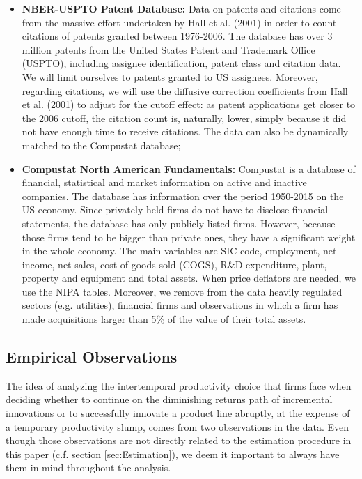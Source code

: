 \documentclass[letterpaper,12pt]{article}
\theoremstyle{definition}
\begin{document}
\begin{itemize}
	\item \textbf{NBER-USPTO Patent Database:} Data on patents and citations come from the massive effort undertaken by Hall et al. (2001) in order to count citations of patents granted between 1976-2006. The database has over 3 million patents from the United States Patent and Trademark Office (USPTO), including assignee identification, patent class and citation data. We will limit ourselves to patents granted to US assignees. Moreover, regarding citations, we will use the diffusive correction coefficients from Hall et al. (2001) to adjust for the cutoff effect: as patent applications get closer to the 2006 cutoff, the citation count is, naturally, lower, simply because it did not have enough time to receive citations. The data can also be dynamically matched to the Compustat database;
	\item \textbf{Compustat North American Fundamentals:} Compustat is a database of financial, statistical and market information on active and inactive companies. The database has information over the period 1950-2015 on the US economy. Since privately held firms do not have to disclose financial statements, the database has only publicly-listed firms. However, because those firms tend to be bigger than private ones, they have a significant weight in the whole economy. The main variables are SIC code, employment, net income, net sales, cost of goods sold (COGS), R\&D expenditure, plant, property and equipment and total assets. When price deflators are needed, we use the NIPA tables. Moreover, we remove from the data heavily regulated sectors (e.g. utilities), financial firms and observations in which a firm has made acquisitions larger than 5\% of the value of their total assets.
\end{itemize}

\subsection{Empirical Observations}

The idea of analyzing the intertemporal productivity choice that firms face when deciding whether to continue on the diminishing returns path of incremental innovations or to successfully innovate a product line abruptly, at the expense of a temporary productivity slump, comes from two observations in the data. Even though those observations are not directly related to the estimation procedure in this paper (c.f. section \ref{sec:Estimation}), we deem it important to always have them in mind throughout the analysis.
\end{document}
